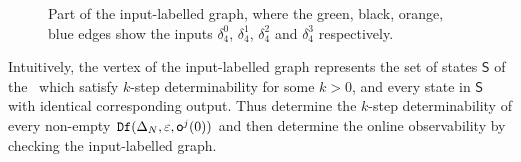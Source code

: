 \begin{figure}[thpb]
      \centering
      
      \caption{Part of the input-labelled graph, where the green, black, orange, blue edges show the inputs $\delta_4^0$, $\delta_4^1$, $\delta_4^2$ and $\delta_4^3$ respectively.}
      \label{fig:4}
\end{figure}

Intuitively, the vertex of the input-labelled graph represents the set of states $\mathsf{S}$ of the \BCN\ which satisfy $k$-step determinability for some $k>0$, and every state in $\mathsf{S}$ with identical corresponding output. Thus determine the $k$-step determinability of every non-empty ${\tt Df}(\Delta_N,\varepsilon, \mathsf{o}^{j}(0))$ and then determine the online observability by checking the input-labelled graph.

